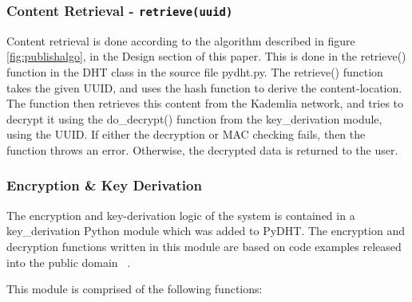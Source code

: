 \subsubsection{Content Retrieval - \texttt{retrieve(uuid)}}

Content retrieval is done according to the algorithm described in figure \ref{fig:publishalgo}, in the Design section of this paper. This is done in the
retrieve() function in the DHT class in the source file pydht.py. The retrieve() function takes the given UUID, and uses the hash function to derive the
content-location. The function then retrieves this content from the Kademlia network, and tries to decrypt it using the do\_decrypt() function from the
key\_derivation module, using the UUID. If either the decryption or MAC checking fails, then the function throws an error. Otherwise, the decrypted data
is returned to the user.

\subsubsection{Encryption \& Key Derivation}

The encryption and key-derivation logic of the system is contained in a key\_derivation Python module which was added to PyDHT. The encryption and decryption functions
written in this module are based on code examples released into the public domain ~\cite{kdfexample}.

This module is comprised of the following functions:


